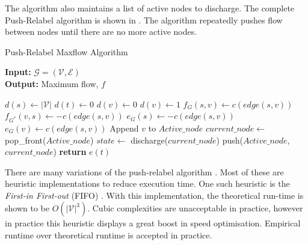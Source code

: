 The algorithm also maintains a list of active nodes to discharge. The complete Push-Relabel algorithm is shown in . The algorithm repeatedly pushes flow between nodes until there are no more active nodes.

\begin{algorithm}[!t]
	\caption{Push-Relabel Maxflow Algorithm}\label{alg:pushrelabelcomplete}
	\textbf{Input:} $\mathcal{G}=(\mathcal{V},\mathcal{E})$\\
	\textbf{Output:} Maximum flow, $f$
	\begin{algorithmic}[1]
		\State $d(s) \gets |\mathcal{V}|$
		\State $d(t) \gets 0$
		\State $d(v) \gets 0$
		\EndFor
		\State $d(v) \gets 1$
		\State $f_{G}(s,v) \gets c(edge (s,v))$
		\State $f_{G^*}(v,s) \gets -c(edge (s,v))$
		\State $e_G(s) \gets -c(edge (s,v))$
		\State $e_G(v) \gets c(edge (s,v))$
		\State Append $v$ to $Active\_node$
		\EndFor
		\State $current\_node \gets$ pop\_front($Active\_node$)
		\State $state \gets$ discharge($current\_node$)
		\State push($Active\_node$,$current\_node$)
		\EndIf
		\EndWhile
		\State \textbf{return} $e(t)$
		\EndProcedure
	\end{algorithmic}
\end{algorithm}

There are many variations of the push-relabel algorithm \citep{Cherkassky1997,Goldberg1988}. Most of these are heuristic implementations to reduce execution time. One such heuristic is the \textit{First-in First-out} (FIFO) \citep{Goldberg1988}. With this implementation, the theoretical run-time is shown to be $O(|\mathcal{V}|^3)$. Cubic complexities are unacceptable in practice, however in practice this heuristic displays a great boost in speed optimisation. Empirical runtime over theoretical runtime is accepted in practice. 

